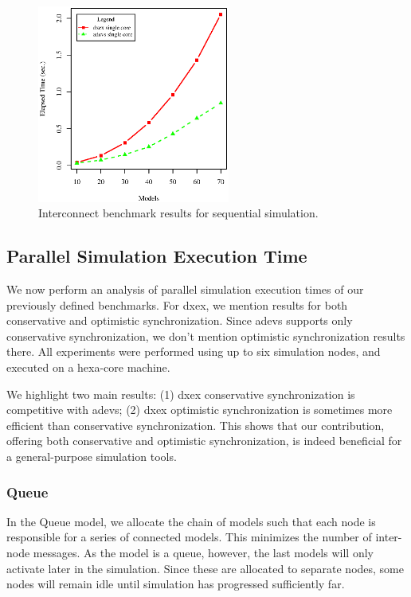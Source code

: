 \begin{figure}
	\includegraphics[width=\columnwidth,height=6.5cm]{fig/interconnect_sequential.eps}
	\caption{Interconnect benchmark results for sequential simulation.}
	\label{fig:Interconnect_benchmark}
\end{figure}

\subsection{Parallel Simulation Execution Time}
We now perform an analysis of parallel simulation execution times of our previously defined benchmarks.
For dxex, we mention results for both conservative and optimistic synchronization.
Since adevs supports only conservative synchronization, we don't mention optimistic synchronization results there.
All experiments were performed using up to six simulation nodes, and executed on a hexa-core machine.

We highlight two main results:
(1) dxex conservative synchronization is competitive with adevs;
(2) dxex optimistic synchronization is sometimes more efficient than conservative synchronization.
This shows that our contribution, offering both conservative and optimistic synchronization, is indeed beneficial for a general-purpose simulation tools.

\subsubsection{Queue}
In the Queue model, we allocate the chain of models such that each node is responsible for a series of connected models.
This minimizes the number of inter-node messages.
As the model is a queue, however, the last models will only activate later in the simulation.
Since these are allocated to separate nodes, some nodes will remain idle until simulation has progressed sufficiently far.

